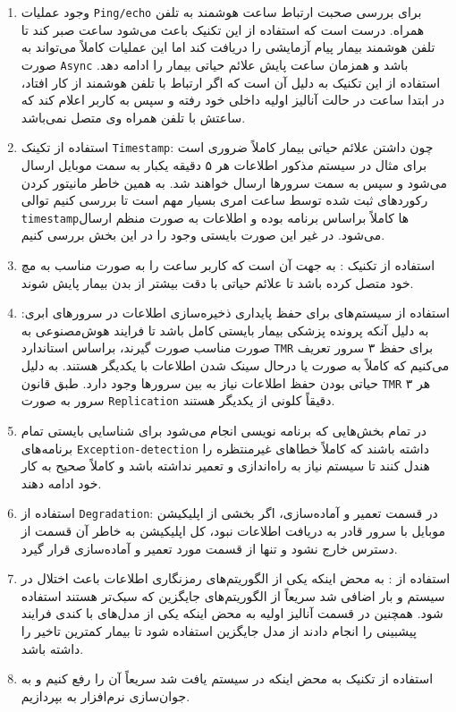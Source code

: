 \begin{enumerate}
    \item وجود عملیات \texttt{Ping/echo} برای بررسی صحبت ارتباط ساعت هوشمند به
    تلفن همراه. درست است که استفاده از این تکنیک باعث می‌شود ساعت صبر کند تا
    تلفن هوشمند بیمار پیام آزمایشی را دریافت کند اما این عملیات کاملاً می‌تواند
    به صورت \texttt{Async} باشد و همزمان ساعت پایش علائم حیاتی بیمار را ادامه
    دهد. استفاده از این تکنیک به دلیل آن است که اگر ارتباط با تلفن هوشمند از کار
    افتاد، در ابتدا ساعت در حالت آنالیز اولیه داخلی خود رفته و سپس به کاربر
    اعلام کند که ساعتش با تلفن همراه وی متصل نمی‌باشد.
    \item استفاده از تکینک \texttt{Timestamp}: چون داشتن علائم حیاتی بیمار
    کاملاً ضروری است برای مثال در سیستم مذکور اطلاعات هر ۵ دقیقه یکبار به سمت
    موبایل ارسال می‌شود و سپس به سمت سرور‌ها ارسال خواهند شد. به همین خاطر
    مانیتور کردن رکورد‌های ثبت شده توسط ساعت امری بسیار مهم است تا بررسی کنیم
    توالی \texttt{timestamp}ها کاملاً براساس برنامه بوده و اطلاعات به صورت منظم
    ارسال می‌شود. در غیر این صورت بایستی وجود  را در این بخش بررسی
    کنیم.
    \item استفاده از تکنیک : به جهت آن است که کاربر
    ساعت را به صورت مناسب به مچ خود متصل کرده باشد تا علائم حیاتی با دقت بیشتر
    از بدن بیمار پایش شوند.
    \item استفاده از سیستم‌های  برای حفظ پایداری ذخیره‌سازی اطلاعات
    در سرور‌های ابری: به دلیل آنکه پرونده پزشکی بیمار بایستی کامل باشد تا فرایند
    هوش‌مصنوعی به صورت مناسب صورت گیرند، براساس استاندارد \texttt{TMR} برای حفظ
     ۳ سرور تعریف می‌کنیم که کاملاً به صورت  یا
     درحال سینک شدن اطلاعات با یکدیگر هستند. به دلیل حیاتی
    بودن حفظ اطلاعات نیاز به  بین سرور‌ها وجود دارد. طبق
    قانون \texttt{TMR} هر ۳ سرور به صورت \texttt{Replication} دقیقاً کلونی از
    یکدیگر هستند.
    \item در تمام بخش‌هایی که برنامه نویسی انجام می‌شود برای شناسایی 
    بایستی تمام برنامه‌های \texttt{Exception-detection} داشته باشند که کاملاً
    خطا‌های غیرمنتظره را هندل کنند تا سیستم نیاز به راه‌اندازی و تعمیر نداشته
    باشد و کاملاً صحیح به کار خود ادامه دهند.
    \item استفاده از \texttt{Degradation}: در قسمت تعمیر و آماده‌سازی، اگر بخشی
    از اپلیکیشن موبایل با سرور قادر به دریافت اطلاعات نبود، کل اپلیکیشن به خاطر
    آن قسمت از دسترس خارج نشود و تنها از قسمت مورد تعمیر و آماده‌سازی قرار گیرد.
    \item استفاده از : به محض اینکه یکی از
    الگوریتم‌های رمزنگاری اطلاعات باعث اختلال در سیستم و بار اضافی شد سریعاً از
    الگوریتم‌های جایگزین که سبک‌‌تر هستند استفاده شود. همچنین در قسمت آنالیز
    اولیه به محض اینکه یکی از مدل‌های  با کندی فرایند پیشبینی را انجام
    دادند از مدل جایگزین استفاده شود تا بیمار کمترین تاخیر را داشته باشد.
    \item استفاده از تکنیک  به محض اینکه
     در سیستم یافت شد سریعاً آن را رفع کنیم و به جوان‌سازی نرم‌افزار
    به بپردازیم.
\end{enumerate}

